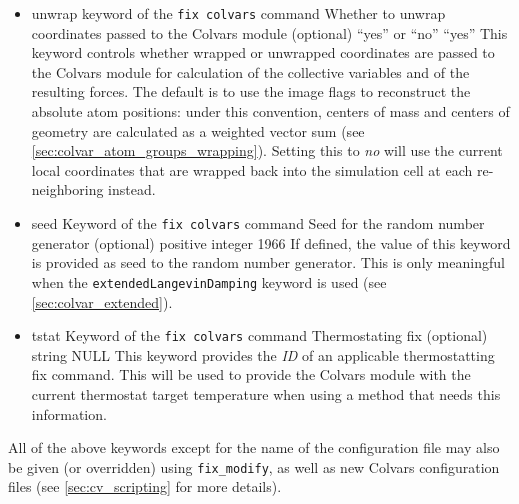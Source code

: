 {\begin{itemize}
\item %
  \keydef
    {unwrap}{%
    keyword of the \texttt{fix colvars} command}{%
    Whether to unwrap coordinates passed to the Colvars module (optional)}{%
    ``yes'' or ``no''}{%
    ``yes''}{%
    This keyword controls whether wrapped or unwrapped coordinates are passed to the Colvars module for calculation of the collective variables and of the resulting forces. The default is to use the image flags to reconstruct the absolute atom positions: under this convention, centers of mass and centers of geometry are calculated as a weighted vector sum (see \ref{sec:colvar_atom_groups_wrapping}).
Setting this to \emph{no} will use the current local coordinates that are wrapped back into the simulation cell at each re-neighboring instead.}

\item %
  \keydef
    {seed}{%
    Keyword of the \texttt{fix colvars} command}{%
    Seed for the random number generator (optional)}{%
    positive integer}{%
    1966}{%
    If defined, the value of this keyword is provided as seed to the random number generator.
    This is only meaningful when the \texttt{extendedLangevinDamping} keyword is used (see \ref{sec:colvar_extended}).}

\item %
  \keydef
    {tstat}{%
    Keyword of the \texttt{fix colvars} command}{%
    Thermostating fix (optional)}{%
    string}{%
    NULL}{%
    This keyword provides the \emph{ID} of an applicable thermostatting fix command. This will be used to provide the Colvars module with the current thermostat target temperature when using a method that needs this information.}

\end{itemize}

All of the above keywords except for the name of the configuration file may also be given (or overridden) using \texttt{fix\_modify}, as well as new Colvars configuration files (see \ref{sec:cv_scripting} for more details).

}


